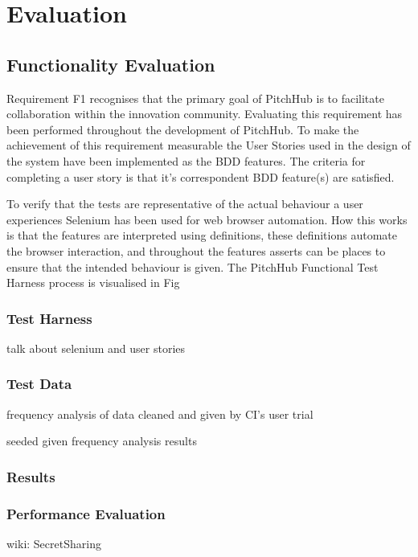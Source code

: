 \chapter{Evaluation}

\section{Functionality Evaluation}
Requirement F1 recognises that the primary goal of PitchHub is to facilitate collaboration within the innovation community. Evaluating this requirement has been performed throughout the development of PitchHub. To make the achievement of this requirement measurable the User Stories used in the design of the system have been implemented as the BDD features. The criteria for completing a user story is that it's correspondent BDD feature(s) are satisfied.
\par
To verify that the tests are representative of the actual behaviour a user experiences Selenium has been used for web browser automation. How this works is that the features are interpreted using definitions, these definitions automate the browser interaction, and throughout the features asserts can be places to ensure that the intended behaviour is given. The PitchHub Functional Test Harness process is visualised in Fig

\subsection{Test Harness}

talk about selenium and user stories

\subsection{Test Data}

frequency analysis of data cleaned and given by CI's user trial

seeded given frequency analysis results

\subsection{Results}

\subsection{Performance Evaluation}

wiki: SecretSharing


